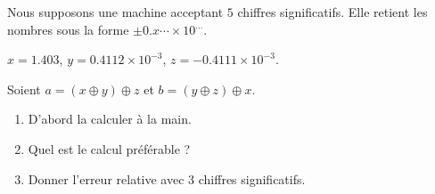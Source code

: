 
\begin{exercice}\label{exomazhe-0002}

    Nous supposons une machine acceptant \( 5\) chiffres significatifs. Elle retient les nombres sous la forme \( \pm 0.x\cdots\times 10^{\ldots}\).
    
    \( x=1.403\), \( y=0.4112\times 10^{-3}\), \( z=-0.4111\times 10^{-3}\). 

    Soient
            \( a=(x\oplus y)\oplus z\) et  \( b=(y\oplus z)\oplus x\).

    \begin{enumerate}
        \item
     D'abord la calculer à la main. 
        \item
     Quel est le calcul préférable ?
 \item
     Donner l'erreur relative avec \( 3\) chiffres significatifs.
    \end{enumerate}



\end{exercice}
